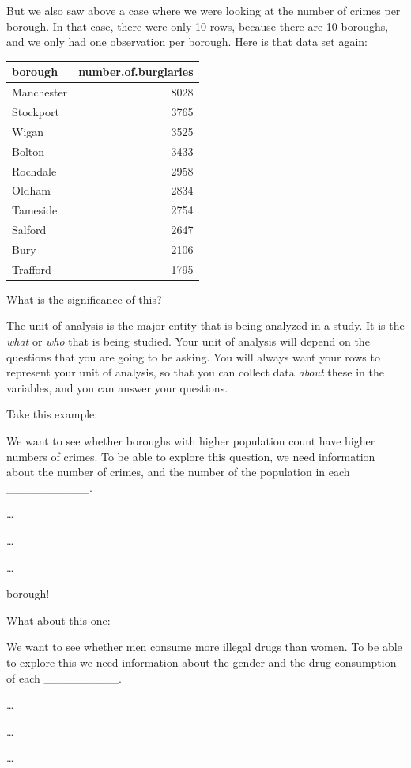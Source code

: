 \documentclass[
]{book}
\begin{document}
But we also saw above a case where we were looking at the number of crimes per borough. In that case, there were only 10 rows, because there are 10 boroughs, and we only had one observation per borough. Here is that data set again:

\begin{tabular}{l|r}
\hline
borough & number.of.burglaries\\
\hline
Manchester & 8028\\
\hline
Stockport & 3765\\
\hline
Wigan & 3525\\
\hline
Bolton & 3433\\
\hline
Rochdale & 2958\\
\hline
Oldham & 2834\\
\hline
Tameside & 2754\\
\hline
Salford & 2647\\
\hline
Bury & 2106\\
\hline
Trafford & 1795\\
\hline
\end{tabular}

What is the significance of this?

The unit of analysis is the major entity that is being analyzed in a study. It is the \emph{what} or \emph{who} that is being studied. Your unit of analysis will depend on the questions that you are going to be asking. You will always want your rows to represent your unit of analysis, so that you can collect data \emph{about} these in the variables, and you can answer your questions.

Take this example:

We want to see whether boroughs with higher population count have higher numbers of crimes. To be able to explore this question, we need information about the number of crimes, and the number of the population in each \_\_\_\_\_\_\_\_\_\_.

\ldots{}

\ldots{}

\ldots{}

borough!

What about this one:

We want to see whether men consume more illegal drugs than women. To be able to explore this we need information about the gender and the drug consumption of each \_\_\_\_\_\_\_\_\_.

\ldots{}

\ldots{}

\ldots{}
\end{document}
